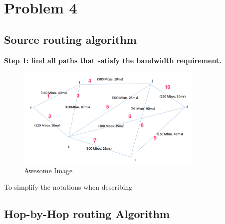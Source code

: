 \section{Problem 4}
\subsection{Source routing algorithm}
\textbf{Step 1: find all paths that satisfy the bandwidth requirement.}

\begin{figure}[h]
    \centering
    \includegraphics[width=0.8\textwidth]{labeled.png}
    \caption{Awesome Image}
    \label{fig:awesome_image}
\end{figure}

To simplify the notations when describing



\subsection{Hop-by-Hop routing Algorithm}
